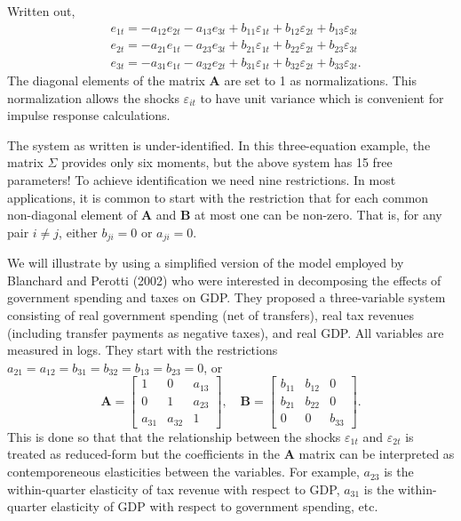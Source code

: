\documentclass[10pt]{article}
\begin{document}
Written out,
$$
\begin{aligned}
&e_{1 t}=-a_{12} e_{2 t}-a_{13} e_{3 t}+b_{11} \varepsilon_{1 t}+b_{12} \varepsilon_{2 t}+b_{13} \varepsilon_{3 t} \\
&e_{2 t}=-a_{21} e_{1 t}-a_{23} e_{3 t}+b_{21} \varepsilon_{1 t}+b_{22} \varepsilon_{2 t}+b_{23} \varepsilon_{3 t} \\
&e_{3 t}=-a_{31} e_{1 t}-a_{32} e_{2 t}+b_{31} \varepsilon_{1 t}+b_{32} \varepsilon_{2 t}+b_{33} \varepsilon_{3 t} .
\end{aligned}
$$
The diagonal elements of the matrix $\boldsymbol{A}$ are set to 1 as normalizations. This normalization allows the shocks $\varepsilon_{i t}$ to have unit variance which is convenient for impulse response calculations.

The system as written is under-identified. In this three-equation example, the matrix $\Sigma$ provides only six moments, but the above system has 15 free parameters! To achieve identification we need nine restrictions. In most applications, it is common to start with the restriction that for each common non-diagonal element of $\boldsymbol{A}$ and $\boldsymbol{B}$ at most one can be non-zero. That is, for any pair $i \neq j$, either $b_{j i}=0$ or $a_{j i}=0$.

We will illustrate by using a simplified version of the model employed by Blanchard and Perotti (2002) who were interested in decomposing the effects of government spending and taxes on GDP. They proposed a three-variable system consisting of real government spending (net of transfers), real tax revenues (including transfer payments as negative taxes), and real GDP. All variables are measured in logs. They start with the restrictions $a_{21}=a_{12}=b_{31}=b_{32}=b_{13}=b_{23}=0$, or
$$
\boldsymbol{A}=\left[\begin{array}{ccc}
1 & 0 & a_{13} \\
0 & 1 & a_{23} \\
a_{31} & a_{32} & 1
\end{array}\right], \quad \boldsymbol{B}=\left[\begin{array}{ccc}
b_{11} & b_{12} & 0 \\
b_{21} & b_{22} & 0 \\
0 & 0 & b_{33}
\end{array}\right] .
$$
This is done so that that the relationship between the shocks $\varepsilon_{1 t}$ and $\varepsilon_{2 t}$ is treated as reduced-form but the coefficients in the $\boldsymbol{A}$ matrix can be interpreted as contemporeneous elasticities between the variables. For example, $a_{23}$ is the within-quarter elasticity of tax revenue with respect to GDP, $a_{31}$ is the within-quarter elasticity of GDP with respect to government spending, etc.
\end{document}
